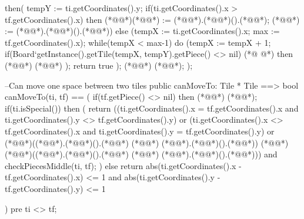 \begin{vdmpp}[breaklines=true]
     then(
         tempY := ti.getCoordinates().y;
         if(ti.getCoordinates().x > tf.getCoordinates().x)
         then (*@\vdmnotcovered{(}@*)(*@@*) := (*@@*).(*@@*)().(*@@*); (*@@*) := (*@@*).(*@@*)().(*@@*))
         else (tempX := ti.getCoordinates().x; max := tf.getCoordinates().x);
        while(tempX < max-1)
         do (tempX := tempX + 1;
           if(Board`getInstance().getTile(tempX, tempY).getPiece() <> nil)
(*@
\label{canMoveTo:66}
@*)
            then (*@@*) (*@@*)
           );
        return true
    );
    (*@@*) (*@@*);
  );

    --Can move one space between two tiles
  public canMoveTo: Tile * Tile ==> bool
  canMoveTo(ti, tf) == (
   if(tf.getPiece() <> nil)
    then (*@@*) (*@@*);
   if(ti.isSpecial())
    then (
     return ((ti.getCoordinates().x = tf.getCoordinates().x and ti.getCoordinates().y <> tf.getCoordinates().y) or
          (ti.getCoordinates().x <> tf.getCoordinates().x and ti.getCoordinates().y = tf.getCoordinates().y) or
          (*@@*)((*@@*).(*@@*)().(*@@*) (*@\vdmnotcovered{-}@*) (*@@*).(*@@*)().(*@@*)) (*@\vdmnotcovered{=}@*) (*@@*)((*@@*).(*@@*)().(*@@*) (*@\vdmnotcovered{-}@*) (*@@*).(*@@*)().(*@@*))) and
          checkPiecesMiddle(ti, tf);
    )
   else
    return abs(ti.getCoordinates().x - tf.getCoordinates().x) <= 1 and
        abs(ti.getCoordinates().y - tf.getCoordinates().y) <= 1

  ) pre ti <> tf;
  

\end{vdmpp}
